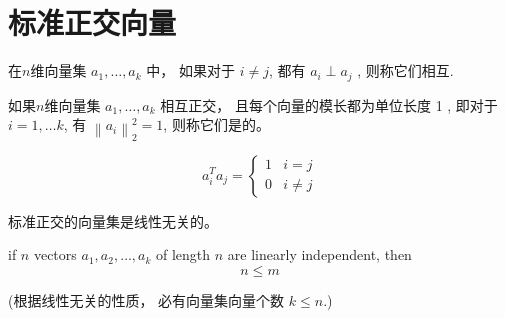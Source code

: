 \section{标准正交向量}

\begin{definition}
    \label{Def:OrthogonalVectors}
    在$n$维向量集 $ a_{1}, \ldots, a_{k} $ 中，  如果对于 $ i \neq j $, 都有 $ a_{i} \perp a_{j} $ ,  则称它们相互. 
\end{definition}

\begin{definition}
    \label{Def:OrthonormalVectors}
    如果$n$维向量集 $ a_{1}, \ldots, a_{k} $ 相互正交， 且每个向量的模长都为单位长度 1 ,  即对于 $ i=1, \ldots k $, 有 $ \left\|a_{i}\right\|_{2}^{2}=1 $, 则称它们是的。 

    \begin{equation} a_{i}^{T} a_{j}=\left\{\begin{array}{ll}1 & i=j \\ 0 & i \neq j\end{array}\right. \end{equation}
\end{definition}

\begin{corollary}
    标准正交的向量集是线性无关的。 
\end{corollary}

\begin{theorem}
    if $ n $ vectors $ a_{1}, a_{2}, \ldots, a_{k} $ of length $ n $ are linearly independent, then
\begin{equation}
n \leq m
\end{equation}

    (根据线性无关的性质， 必有向量集向量个数 $ k \leq n $.)
\end{theorem}

